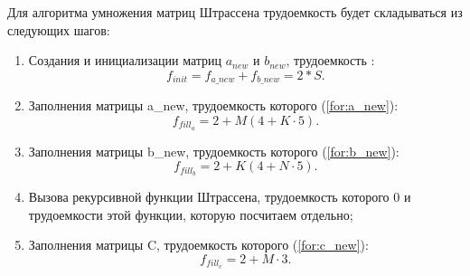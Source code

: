 Для алгоритма умножения матриц Штрассена трудоемкость будет складываться из следующих шагов:
\begin{enumerate}
	\item Создания и инициализации матриц $a_{new}$ и $b_{new}$, трудоемкость :
	\begin{equation}
		\label{for:init_s}
		f_{init} = f_{a\_new} + f_{b\_new} = 2 * S.
	\end{equation}
	\item Заполнения матрицы a\_new, трудоемкость которого (\ref{for:a_new}):
	\begin{equation}
		\label{for:a_new}
		f_{fill_a} = 2 + M (4 + K \cdot 5).
	\end{equation}
	\item Заполнения матрицы b\_new, трудоемкость которого (\ref{for:b_new}):
	\begin{equation}
		\label{for:b_new}
		f_{fill_b} = 2 + K (4 + N \cdot 5).
	\end{equation}
	\item Вызова рекурсивной функции Штрассена, трудоемкость которого 0 и трудоемкости этой функции, которую посчитаем отдельно;
	\item Заполнения матрицы C, трудоемкость которого (\ref{for:c_new}):
	\begin{equation}
		\label{for:c_new}
		f_{fill_c} = 2 + M \cdot 3.
	\end{equation}
\end{enumerate}

